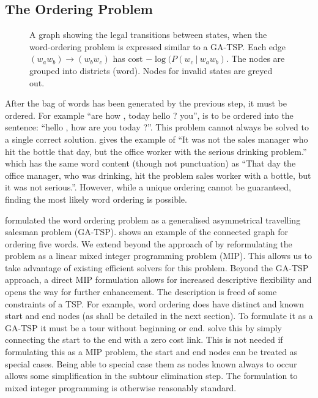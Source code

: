 \documentclass[11pt]{article}
\theoremstyle{plain}
\theoremstyle{definition}
\newcommand{\textcite}{\protect\newcite}
\begin{document}
\subsection{The Ordering Problem} \label{ordering}
\begin{figure*}
	\begin{center}
	
	\end{center}
	\caption{\label{fig:ordergraph} A graph showing the legal transitions between states, when the word-ordering problem is expressed similar to a GA-TSP. Each edge $(w_aw_b)\to (w_bw_c)$ has cost $-\log(P(w_c\:|\:w_aw_b)$. The nodes are grouped into districts (word). Nodes for invalid states are greyed out.} 
\end{figure*}

After the bag of words has been generated by the previous step, it must be ordered. For example ``are how , today hello ? you'', is to be ordered into the sentence: ``hello , how are you today ?''. This problem cannot always be solved to a single correct solution. \textcite{Mitchell2008}  gives the example of ``It was not the sales manager who hit the bottle that day, but the office worker with the serious drinking problem.'' which has the same word content (though not punctuation) as ``That day the office manager, who was drinking, hit the problem sales worker with a bottle, but it was not serious.''. However, while a unique ordering cannot be guaranteed, finding the most likely word ordering is possible.

\textcite{Horvat2014} formulated the word ordering problem as a generalised asymmetrical travelling salesman problem (GA-TSP).  shows an example of the connected graph for ordering five words. We extend beyond the approach of \textcite{Horvat2014} by reformulating the problem as a linear mixed integer programming problem (MIP). This allows us to take advantage of existing efficient solvers for this problem. 
Beyond the GA-TSP approach, a direct MIP formulation allows for increased descriptive flexibility and opens the way for further enhancement. The description is freed of some constraints of a TSP.  For example, word ordering does have distinct and known start and end nodes (as shall be detailed in the next section). To formulate it as a GA-TSP it must be a tour without beginning or end. \textcite{Horvat2014} solve this by simply connecting the start to the end with a zero cost link. This is not needed if formulating this as a MIP problem, the start and end nodes can be treated as special cases. Being able to special case them as nodes known always to occur allows some simplification in the subtour elimination step. The formulation to mixed integer programming is otherwise reasonably standard.
\end{document}
